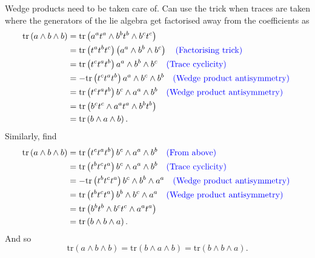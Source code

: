 \documentclass{article}
\begin{document}
\noindent Wedge products need to be taken care of. Can use the trick when traces are taken where the generators of the lie algebra get factorised away from the coefficients as 
\begin{align}
    \text{tr}\left(a\wedge b\wedge b \right)&= \text{tr}\left(a^{a}t^{a}\wedge b^{b}t^{b}\wedge b^{c}t^{c} \right)\nonumber \\
    &= \text{tr}\left(t^{a}t^{b}t^{c} \right)\left(a^{a}\wedge b^{b}\wedge b^{c} \right)\nonumber\quad \text{\color{blue}(Factorising trick) \color{black}}\\
    &= \text{tr}\left(t^{c}t^{a}t^{b} \right)a^{a}\wedge b^{b}\wedge b^{c} \nonumber\quad \text{\color{blue}(Trace cyclicity) \color{black}}\\
    &= -\text{tr}\left(t^{c}t^{a}t^{b} \right)a^{a}\wedge b^{c}\wedge b^{b} \nonumber\quad \text{\color{blue}(Wedge product antisymmetry) \color{black}}\\
    &= \text{tr}\left(t^{c}t^{a}t^{b} \right)b^{c}\wedge a^{a}\wedge b^{b} \nonumber\quad \text{\color{blue}(Wedge product antisymmetry) \color{black}}\\
    &=\text{tr}\left(b^{c}t^{c}\wedge a^{a}t^{a}\wedge b^{b}t^{b} \right)\nonumber \\
    &=  \text{tr}\left(b\wedge a\wedge b \right).
\end{align}
Similarly, find 
\begin{align}
    \text{tr}\left(a\wedge b\wedge b \right)&= \text{tr}\left(t^{c}t^{a}t^{b} \right)b^{c}\wedge a^{a}\wedge b^{b} \nonumber\nonumber\quad \text{\color{blue}(From above) \color{black}}\\
    &= \text{tr}\left(t^{b}t^{c}t^{a}\right)b^{c}\wedge a^{a}\wedge b^{b} \nonumber\quad \text{\color{blue}(Trace cyclicity) \color{black}}\\
    &= - \text{tr}\left(t^{b}t^{c}t^{a}\right)b^{c}\wedge b^{b}\wedge a^{a} \nonumber\quad \text{\color{blue}(Wedge product antisymmetry) \color{black}}\\
    &= \text{tr}\left(t^{b}t^{c}t^{a}\right) b^{b}\wedge b^{c}\wedge a^{a} \nonumber\quad \text{\color{blue}(Wedge product antisymmetry) \color{black}}\\
    &= \text{tr}\left(b^{b}t^{b}\wedge b^{c}t^{c}\wedge a^{a}t^{a}\right)\\
    &= \text{tr}\left(b\wedge b \wedge a \right).
\end{align}
And so
\begin{equation}
    \boxed{
    \text{tr}\left(a\wedge b \wedge b\right) = \text{tr}\left(b\wedge a \wedge b\right) = \text{tr}
    \left(b\wedge b \wedge a\right).
    }
\end{equation}
\end{document}
